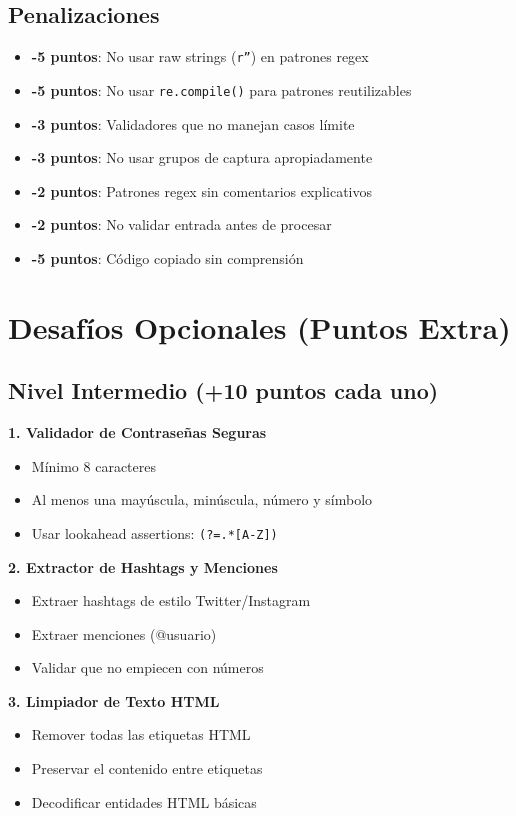 \documentclass[11pt,letterpaper]{article}
\begin{document}
\subsection{Penalizaciones}

\begin{itemize}
    \item \textbf{-5 puntos}: No usar raw strings (\texttt{r''}) en patrones regex
    \item \textbf{-5 puntos}: No usar \texttt{re.compile()} para patrones reutilizables
    \item \textbf{-3 puntos}: Validadores que no manejan casos límite
    \item \textbf{-3 puntos}: No usar grupos de captura apropiadamente
    \item \textbf{-2 puntos}: Patrones regex sin comentarios explicativos
    \item \textbf{-2 puntos}: No validar entrada antes de procesar
    \item \textbf{-5 puntos}: Código copiado sin comprensión
\end{itemize}

\section{Desafíos Opcionales (Puntos Extra)}

\subsection{Nivel Intermedio (+10 puntos cada uno)}

\textbf{1. Validador de Contraseñas Seguras}
\begin{itemize}
    \item Mínimo 8 caracteres
    \item Al menos una mayúscula, minúscula, número y símbolo
    \item Usar lookahead assertions: \texttt{(?=.*[A-Z])}
\end{itemize}

\textbf{2. Extractor de Hashtags y Menciones}
\begin{itemize}
    \item Extraer hashtags de estilo Twitter/Instagram
    \item Extraer menciones (@usuario)
    \item Validar que no empiecen con números
\end{itemize}

\textbf{3. Limpiador de Texto HTML}
\begin{itemize}
    \item Remover todas las etiquetas HTML
    \item Preservar el contenido entre etiquetas
    \item Decodificar entidades HTML básicas
\end{itemize}
\end{document}

